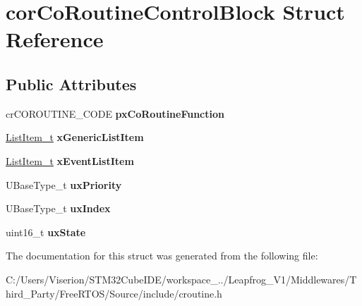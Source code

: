 \hypertarget{structcor_co_routine_control_block}{}\section{cor\+Co\+Routine\+Control\+Block Struct Reference}
\label{structcor_co_routine_control_block}
\subsection*{Public Attributes}
\begin{DoxyCompactItemize}
\item 
\mbox{\label{structcor_co_routine_control_block_acc98c7364cd88e8e034a5f9bba113832}} 
cr\+C\+O\+R\+O\+U\+T\+I\+N\+E\+\_\+\+C\+O\+DE {\bfseries px\+Co\+Routine\+Function}
\item 
\mbox{\label{structcor_co_routine_control_block_aa2900494db8782eeb8ef12d482501406}} 
\mbox{\hyperlink{structx_l_i_s_t___i_t_e_m}{List\+Item\+\_\+t}} {\bfseries x\+Generic\+List\+Item}
\item 
\mbox{\label{structcor_co_routine_control_block_a105d316da0069f766acc3b210afed1b9}} 
\mbox{\hyperlink{structx_l_i_s_t___i_t_e_m}{List\+Item\+\_\+t}} {\bfseries x\+Event\+List\+Item}
\item 
\mbox{\label{structcor_co_routine_control_block_a752101a5d41b5caa7fd5149436613c8f}} 
U\+Base\+Type\+\_\+t {\bfseries ux\+Priority}
\item 
\mbox{\label{structcor_co_routine_control_block_a6c185cd2145f562fb570bea9b158fc81}} 
U\+Base\+Type\+\_\+t {\bfseries ux\+Index}
\item 
\mbox{\label{structcor_co_routine_control_block_aa0d702ff5a23c61598fe13e5a78fb1dc}} 
uint16\+\_\+t {\bfseries ux\+State}
\end{DoxyCompactItemize}


The documentation for this struct was generated from the following file\+:\begin{DoxyCompactItemize}
\item 
C\+:/\+Users/\+Viserion/\+S\+T\+M32\+Cube\+I\+D\+E/workspace\+\_../\+Leapfrog\+\_\+\+V1/\+Middlewares/\+Third\+\_\+\+Party/\+Free\+R\+T\+O\+S/\+Source/include/croutine.\+h\end{DoxyCompactItemize}

